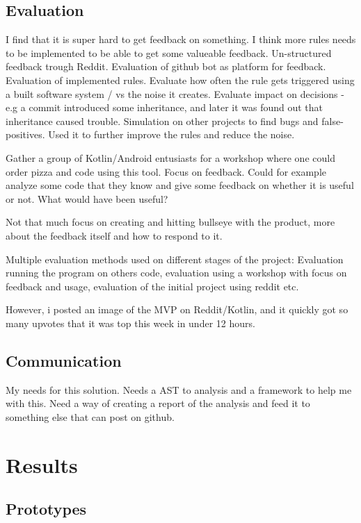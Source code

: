 \documentclass{article}
\begin{document}
\subsection{Evaluation}
I find that it is super hard to get feedback on something. I think more rules needs to be implemented to be able to get some valueable feedback. Un-structured feedback trough Reddit. Evaluation of github bot as platform for feedback. Evaluation of implemented rules. Evaluate how often the rule gets triggered using a built software system / vs the noise it creates. Evaluate impact on decisions - e.g a commit introduced some inheritance, and later it was found out that inheritance caused trouble. Simulation on other projects to find bugs and false-positives. Used it to further improve the rules and reduce the noise.

Gather a group of Kotlin/Android entusiasts for a workshop where one could order pizza and code using this tool. Focus on feedback. Could for example analyze some code that they know and give some feedback on whether it is useful or not. What would have been useful?

Not that much focus on creating and hitting bullseye with the product, more about the feedback itself and how to respond to it.

Multiple evaluation methods used on different stages of the project: Evaluation running the program on others code, evaluation using a workshop with focus on feedback and usage, evaluation of the initial project using reddit etc.

However, i posted an image of the MVP on Reddit/Kotlin, and it quickly got so many upvotes that it was top this week in under 12 hours. 

\subsection{Communication}


My needs for this solution. Needs a AST to analysis and a framework to help me with this. Need a way of creating a report of the analysis and feed it to something else that can post on github. 


\section{Results}
\subsection{Prototypes}
\end{document}
